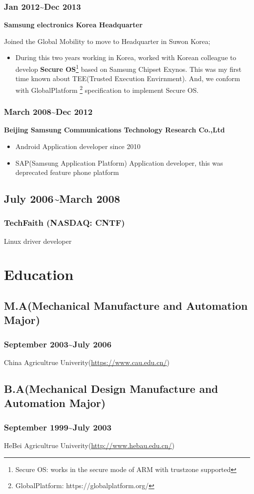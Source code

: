 \documentclass{article}
\begin{document}
\subsubsection{Jan 2012\~{}Dec 2013}
\textbf{Samsung electronics Korea Headquarter}

Joined the Global Mobility to move to Headquarter in Suwon Korea;

\begin{itemize}
\item{}During this two years working in Korea, worked with Korean colleague to develop
\textbf{Secure OS}\footnote{Secure OS: works in the secure mode of ARM with trustzone supported} based on Samsung Chipset Exynos.
This was my first time known about TEE(Trusted Execution Envirnment).
And, we conform with GlobalPlatform {\footnote {GlobalPlatform: https://globalplatform.org/}} specification to implement Secure OS.

\end{itemize}

\subsubsection{March 2008\~{}Dec 2012}
\textbf{Beijing Samsung Communications Technology Research Co.,Ltd}

\begin{itemize}
\item{Android Application developer} since 2010
\item{SAP(Samsung Application Platform) Application developer}, this was deprecated feature phone platform
\end{itemize}

\subsection{July 2006\~{}March 2008}
\subsubsection{TechFaith (NASDAQ: CNTF)}
Linux driver developer

\section{Education}

\subsection{M.A(Mechanical Manufacture and Automation Major)}
\subsubsection{September 2003\~{}July 2006}
China Agricultrue Univerity(\url{https://www.cau.edu.cn/})

\subsection{B.A(Mechanical Design Manufacture and Automation Major)}
\subsubsection{September 1999\~{}July 2003}
HeBei Agricultrue Univerity(\url{http://www.hebau.edu.cn/})
\end{document}
